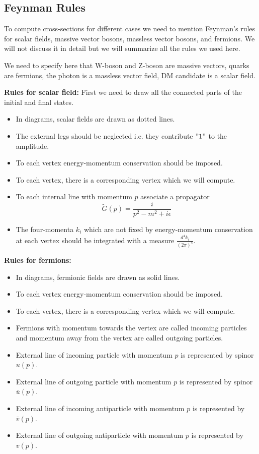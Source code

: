 \documentclass[12pt]{report}
\begin{document}
\begin{appendices}
\chapter{Feynman Rules}
To compute cross-sections for different cases we need to mention Feynman's rules for scalar fields, massive vector bosons, massless vector bosons, and fermions. We will not discuss it in detail but we will summarize all the rules we used here.

We need to specify here that W-boson and Z-boson are massive vectors, quarks are fermions, the photon is a massless vector field, DM candidate is a scalar field.

\textbf{Rules for scalar field:} First we need to draw all the connected parts of the initial and final states.
\begin{itemize}
\item In diagrams, scalar fields are drawn as dotted lines.
\item The external legs should be neglected i.e. they contribute $"1"$ to the amplitude.
\item To each vertex energy-momentum conservation should be imposed.
\item To each vertex, there is a corresponding vertex which we will compute.
\item To each internal line with momentum $p$ associate a propagator $$\tilde{G}(p) = \frac{i}{p^2-m^2+i \epsilon}$$
\item The four-momenta $k_i$ which are not fixed by energy-momentum conservation at each vertex should be integrated with a measure $\frac{d^4 k_i}{(2 \pi)^4}$.
\end{itemize} 

\textbf{Rules for fermions:}

\begin{itemize}
\item In diagrams, fermionic fields are drawn as solid lines.
\item To each vertex energy-momentum conservation should be imposed.
\item To each vertex, there is a corresponding vertex which we will compute.
\item Fermions with momentum towards the vertex are called incoming particles and momentum away from the vertex are called outgoing particles.
\item External line of incoming particle with momentum $p$ is represented by spinor $u(p)$.
\item External line of outgoing particle with momentum $p$ is represented by spinor $\bar{u}(p)$.
\item External line of incoming antiparticle with momentum $p$ is represented by $\bar{v}(p)$.
\item External line of outgoing antiparticle with momentum $p$ is represented by $v(p)$.


\end{itemize}
\end{appendices}
\end{document}
